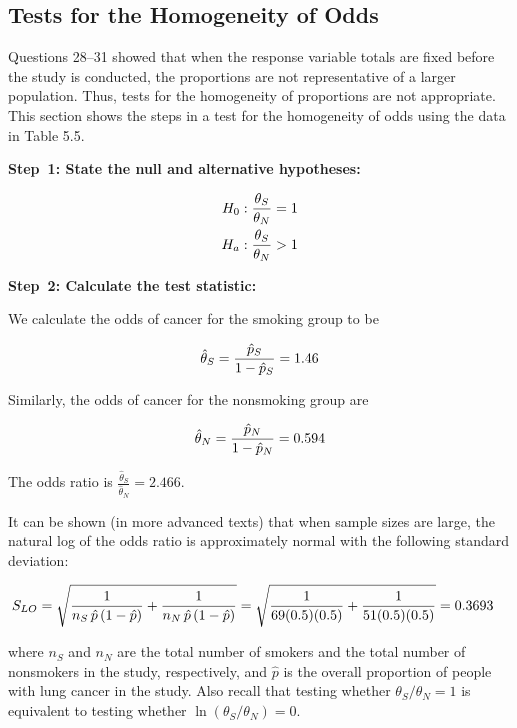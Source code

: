 \documentclass[
]{report}
\begin{document}
\hypertarget{tests-for-the-homogeneity-of-odds}{%
\subsection*{Tests for the Homogeneity of Odds}\label{tests-for-the-homogeneity-of-odds}}

Questions 28--31 showed that when the response variable totals are fixed before the study is conducted, the proportions are not representative of a larger population. Thus, tests for the homogeneity of proportions are not appropriate. This section shows the steps in a test for the homogeneity of odds using the data in Table 5.5.

\textbf{Step~1: State the null and alternative hypotheses:}

\begin{align}
H_0: \frac{\theta_S}{\theta_N} &= 1 \notag \\ 
H_a: \frac{\theta_S}{\theta_N} &> 1 \notag
\end{align}

\textbf{Step~2: Calculate the test statistic:}

We calculate the odds of cancer for the smoking group to be

\begin{align}
\hat\theta_S = \frac{\hat p_S}{1 - \hat p_S} = 1.46 \notag
\end{align}

Similarly, the odds of cancer for the nonsmoking group are

\begin{align}
\hat\theta_N = \frac{\hat p_N}{1 - \hat p_N} = 0.594 \notag
\end{align}

The odds ratio is \(\frac{\hat\theta_S}{\hat\theta_N} = 2.466.\)

It can be shown (in more advanced texts) that when sample sizes are large, the natural log of the odds ratio is approximately normal with the following standard deviation:

\begin{align}
S_{LO} 
&= \sqrt{\frac{1}{n_S\,\hat p\,(1 - \hat p)} + \frac{1}{n_N\,\hat p\,(1 - \hat p)}} 
= \sqrt{\frac{1}{69(0.5)(0.5)} + \frac{1}{51(0.5)(0.5)}} = 0.3693
\notag
\end{align}

where \(\scriptstyle n_S\) and \(\scriptstyle n_N\) are the total number of smokers and the total number of nonsmokers in the study, respectively, and \(\scriptstyle \hat p\) is the overall proportion of people with lung cancer in the study. Also recall that testing whether \(\scriptstyle \theta_S/\theta_N = 1\) is equivalent to testing whether \(\scriptstyle \ln(\theta_S/\theta_N) = 0\).
\end{document}
